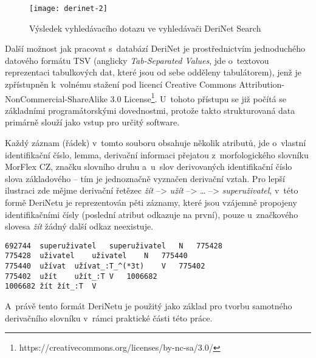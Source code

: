 \begin{figure}[ht]   
    \centering
    \texttt{[image: derinet-2]}  
    \caption{Výsledek vyhledávacího dotazu ve vyhledávači DeriNet Search~\parencite{derinet}}
    \label{derinet-2}
 \end{figure}

Další možnost jak pracovat s~databází DeriNet je prostřednictvím
jednoduchého datového formátu TSV (anglicky \emph{Tab-Separated Values},
jde o~textovou reprezentaci tabulkových dat, které jsou od sebe odděleny
tabulátorem), jenž je zpřístupněn k~volnému stažení pod licencí Creative
Commons Attribution-NonCommercial-ShareAlike 3.0
License\footnote{https://creativecommons.org/licenses/by-nc-sa/3.0/}.
U~tohoto přístupu se již počítá se základními programátorskými
dovednostmi, protože takto strukturovaná data primárně slouží jako vstup
pro určitý software.~\parencite{derinet-cz}

Každý záznam (řádek) v~tomto souboru obsahuje několik atributů, jde
o~vlastní identifikační číslo, lemma, derivační informaci přejatou
z~morfologického slovníku MorFlex CZ, značku slovního druhu a~u~slov
derivovaných identifikační číslo slova základového -- tím je jednoznačně
vyznačen derivační vztah. Pro lepší ilustraci zde mějme derivační
řetězec \emph{žít} --\textgreater{} \emph{užít} --\textgreater{}
\ldots{} --\textgreater{} \emph{superuživatel}, v~této formě DeriNetu je
reprezentován pěti záznamy, které jsou vzájemně propojeny
identifikačními čísly (poslední atribut odkazuje na první), pouze
u~značkového slovesa \emph{žít} žádný další odkaz neexistuje.
\parencite{derinet}

\begin{verbatim}
692744  superuživatel   superuživatel   N   775428
775428  uživatel    uživatel    N   775440
775440  užívat  užívat_:T_^(*3t)    V   775402
775402  užít    užít_:T V   1006682
1006682 žít žít_:T  V
\end{verbatim}

A~právě tento formát DeriNetu je použitý jako základ pro tvorbu
samotného derivačního slovníku v~rámci praktické části této práce.
